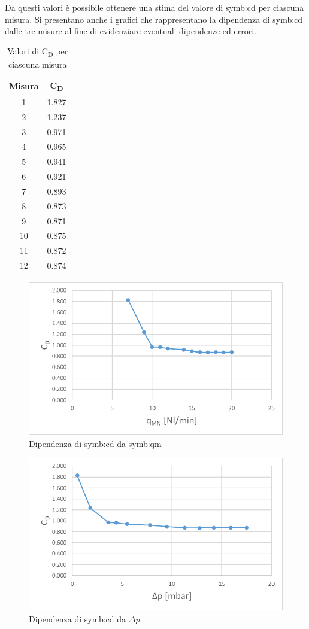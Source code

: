 Da questi valori è possibile ottenere una stima del valore di \gls{symb:cd} per ciascuna misura. Si presentano anche i grafici che rappresentano la dipendenza di \gls{symb:cd} dalle tre misure al fine di evidenziare eventuali dipendenze ed errori.
\begin{table}[H]
	\centering
	\begin{tabular}{c|c}
		\toprule
		\toprule
		\textbf{Misura} & \textbf{C\textsubscript{D}} \\
		\midrule
		\midrule
		1  & 1.827 \\
		\midrule
		2  & 1.237 \\
		\midrule
		3  & 0.971 \\
		\midrule
		4  & 0.965 \\
		\midrule
		5  & 0.941 \\
		\midrule
		6  & 0.921 \\
		\midrule
		7  & 0.893 \\
		\midrule
		8  & 0.873 \\
		\midrule
		9  & 0.871 \\
		\midrule
		10 & 0.875 \\
		\midrule
		11 & 0.872 \\
		\midrule
		12 & 0.874 \\
		\bottomrule
		\bottomrule
	\end{tabular}
	\caption{Valori di C\textsubscript{D} per ciascuna misura}
	\label{tab:valori_cd}
\end{table}
\begin{figure}
	\centering
	\includegraphics[width=0.5\linewidth]{"chapters/5-laboratorio/tabellaqmcd"}
	\caption{Dipendenza di \gls{symb:cd} da \gls{symb:qm}}
	\label{fig:tabellaqmcd}
\end{figure}
\begin{figure}
	\centering
	\includegraphics[width=0.5\linewidth]{"chapters/5-laboratorio/tabelladeltapcd"}
	\caption{Dipendenza di \gls{symb:cd} da $\Delta p$}
	\label{fig:tabelladeltapcd}
\end{figure}

